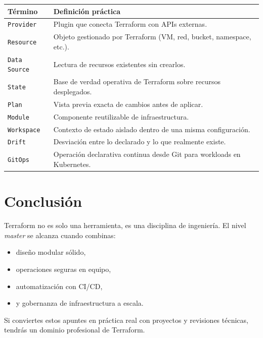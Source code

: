 \documentclass[12pt,a4paper]{article}
\begin{document}
\begin{longtable}{p{} p{}}
\toprule
\textbf{Término} & \textbf{Definición práctica} \\
\midrule
\texttt{Provider} & Plugin que conecta Terraform con APIs externas. \\
\texttt{Resource} & Objeto gestionado por Terraform (VM, red, bucket, namespace, etc.). \\
\texttt{Data Source} & Lectura de recursos existentes sin crearlos. \\
\texttt{State} & Base de verdad operativa de Terraform sobre recursos desplegados. \\
\texttt{Plan} & Vista previa exacta de cambios antes de aplicar. \\
\texttt{Module} & Componente reutilizable de infraestructura. \\
\texttt{Workspace} & Contexto de estado aislado dentro de una misma configuración. \\
\texttt{Drift} & Desviación entre lo declarado y lo que realmente existe. \\
\texttt{GitOps} & Operación declarativa continua desde Git para workloads en Kubernetes. \\
\bottomrule
\end{longtable}

\section{Conclusión}

Terraform no es solo una herramienta, es una disciplina de ingeniería.
El nivel \textit{master} se alcanza cuando combinas:
\begin{itemize}
		\item diseño modular sólido,
		\item operaciones seguras en equipo,
		\item automatización con CI/CD,
		\item y gobernanza de infraestructura a escala.
\end{itemize}

Si conviertes estos apuntes en práctica real con proyectos y revisiones técnicas, tendrás un dominio profesional de Terraform.
\end{document}
